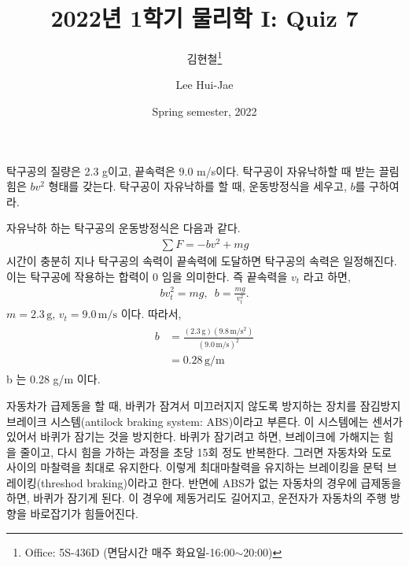 \documentclass[floatfix,nofootinbib,superscriptaddress,fleqn]{revtex4-2}
\begin{document}
\title{\Large 2022년 1학기 물리학 I: Quiz 7}
\author{김현철\footnote{Office: 5S-436D (면담시간 매주
    화요일-16:00$\sim$20:00)}} 
\author{Lee Hui-Jae} 
\date{Spring semester, 2022}


\vspace{1.cm}
\maketitle

탁구공의 질량은 2.3 g이고, 끝속력은 $9.0$ m/s이다. 탁구공이 자유낙하할
때 받는 끌림힘은 $bv^2$ 형태를 갖는다. 탁구공이 자유낙하를 할 때,
운동방정식을 세우고, $b$를 구하여라.  

자유낙하 하는 탁구공의 운동방정식은 다음과 같다.
\begin{align}
  \sum F = -bv^2+mg
\end{align}
시간이 충분히 지나 탁구공의 속력이 끝속력에 도달하면 탁구공의 속력은 
일정해진다. 이는 탁구공에 작용하는 합력이 0 임을 의미한다. 즉 끝속력을
$v_t$ 라고 하면,
\begin{align}
  bv_t^2 = mg,\,\,\, b =\frac{mg}{v_t^2}.
\end{align}
$m = 2.3\,\mathrm{g}$, $v_t = 9.0\,\mathrm{m/s}$ 이다. 따라서,
\begin{align}
  \begin{split}
    b &= \frac{(2.3\,\mathrm{g})(9.8\,\mathrm{m/s^2})}{( 9.0\,\mathrm{m/s})^2}  \\
    &= 0.28\,\mathrm{g/m}
  \end{split}
  \end{align}
  b 는 0.28 g/m 이다.
\vspace{1.cm}

 자동차가 급제동을 할 때, 바퀴가
잠겨서 미끄러지지 않도록 방지하는 장치를 잠김방지 브레이크
시스템(antilock braking system: ABS)이라고 부른다. 이 시스템에는
센서가 있어서 바퀴가 잠기는 것을 방지한다. 바퀴가 잠기려고 하면,
브레이크에 가해지는 힘을 줄이고, 다시 힘을 가하는 과정을 초당 15회
정도 반복한다. 그러면 자동차와 도로 사이의 마찰력을 최대로
유지한다. 이렇게 최대마찰력을 유지하는 브레이킹을 문턱
브레이킹(threshod braking)이라고 한다.
반면에 ABS가 없는 자동차의 경우에 급제동을 하면, 바퀴가
잠기게 된다. 이 경우에 제동거리도 길어지고, 운전자가 자동차의 주행
방향을 바로잡기가 힘들어진다.
\end{document}
